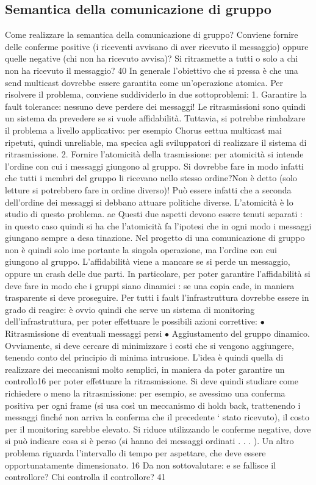 \subsection{Semantica della comunicazione di gruppo}
Come realizzare la semantica della comunicazione di gruppo? Conviene fornire
delle conferme positive (i riceventi avvisano di aver ricevuto il messaggio) oppure
quelle negative (chi non ha ricevuto avvisa)? Si ritrasmette a tutti o solo a chi
non ha ricevuto il messaggio?
40
In generale l'obiettivo che si pressa è che una send multicast dovrebbe
essere garantita come un'operazione atomica. Per risolvere il problema, conviene
suddividerlo in due sottoproblemi:
1. Garantire la fault tolerance: nessuno deve perdere dei messaggi! Le ritrasmissioni sono quindi un sistema da
prevedere se si vuole affidabilità.
Tuttavia, si potrebbe rimbalzare il problema a livello applicativo: per
esempio Chorus eettua multicast mai ripetuti, quindi unreliable, ma
specica agli sviluppatori di realizzare il sistema di ritrasmissione.
2. Fornire l'atomicità della trasmissione: per atomicità si intende l'ordine
con cui i messaggi giungono al gruppo. Si dovrebbe fare in modo infatti
che tutti i membri del gruppo li ricevano nello stesso ordine?Non è detto
(solo letture si potrebbero fare in ordine diverso)! Può essere infatti che
a seconda dell'ordine dei messaggi si debbano attuare politiche diverse.
L'atomicità è lo studio di questo problema.
ae
Questi due aspetti devono essere tenuti separati : in questo caso quindi si ha
che l'atomicità fa l'ipotesi che in ogni modo i messaggi giungano sempre a desa
tinazione. Nel progetto di una comunicazione di gruppo non è quindi solo ime
portante la singola operazione, ma l'ordine con cui giungono al gruppo.
L'affidabilità viene a mancare se si perde un messaggio, oppure un crash
delle due parti. In particolare, per poter garantire l'affidabilità si deve fare in
modo che i gruppi siano dinamici : se una copia cade, in maniera trasparente
si deve proseguire. Per tutti i fault l'infrastruttura dovrebbe essere in grado di
reagire: è ovvio quindi che serve un sistema di monitoring dell'infrastruttura,
per poter effettuare le possibili azioni correttive:
$\bullet$ Ritrasmissione di eventuali messaggi persi
$\bullet$ Aggiustamento del gruppo dinamico.
Ovviamente, si deve cercare di minimizzare i costi che si vengono aggiungere,
tenendo conto del principio di minima intrusione.
L'idea è quindi quella di realizzare dei meccanismi molto semplici, in maniera
da poter garantire un controllo16 per poter effettuare la ritrasmissione. Si deve
quindi studiare come richiedere o meno la ritrasmissione: per esempio, se avessimo una conferma positiva per ogni frame
(si usa così un meccanismo di hold\i{}
back, trattenendo i messaggi finché non arriva la conferma che il precedente `
stato ricevuto), il costo per il monitoring sarebbe elevato. Si riduce utilizzando
le conferme negative, dove si può indicare cosa si è perso (si hanno dei messaggi
ordinati . . . ). Un altro problema riguarda l'intervallo di tempo per aspettare,
che deve essere opportunatamente dimensionato.
16 Da
non sottovalutare: e se fallisce il controllore? Chi controlla il controllore?
41
